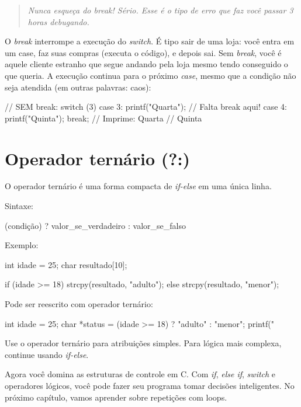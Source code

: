 \begin{quote}
\textit{Nunca esqueça do break! Sério. Esse é o tipo de erro que faz você passar 3 horas debugando.}
\end{quote}

O \textit{break} interrompe a execução do \textit{switch}. É tipo sair de uma loja: você entra em um case, faz suas compras (executa o código), e depois sai. Sem \textit{break}, você é aquele cliente estranho que segue andando pela loja mesmo tendo conseguido o que queria. A execução continua para o próximo \textit{case}, mesmo que a condição não seja atendida (em outras palavras: caos):

\begin{ccode}
  // SEM break:
  switch (3) {
    case 3:
      printf("Quarta\n");
      // Falta break aqui!
    case 4:
      printf("Quinta\n");
      break;
  }
  // Imprime: Quarta
  //          Quinta
\end{ccode}

\section{Operador ternário (?:)}

O operador ternário é uma forma compacta de \textit{if-else} em uma única linha.

Sintaxe:

\begin{ccode}
  (condição) ? valor_se_verdadeiro : valor_se_falso
\end{ccode}

Exemplo:

\begin{ccode}
  int idade = 25;
  char resultado[10];

  if (idade >= 18) {
    strcpy(resultado, "adulto");
  } else {
    strcpy(resultado, "menor");
  }
\end{ccode}

Pode ser reescrito com operador ternário:

\begin{ccode}
  int idade = 25;
  char *status = (idade >= 18) ? "adulto" : "menor";
  printf("%
\end{ccode}

Use o operador ternário para atribuições simples. Para lógica mais complexa, continue usando \textit{if-else}.

Agora você domina as estruturas de controle em C. Com \textit{if}, \textit{else if}, \textit{switch} e operadores lógicos, você pode fazer seu programa tomar decisões inteligentes. No próximo capítulo, vamos aprender sobre repetições com loops.




